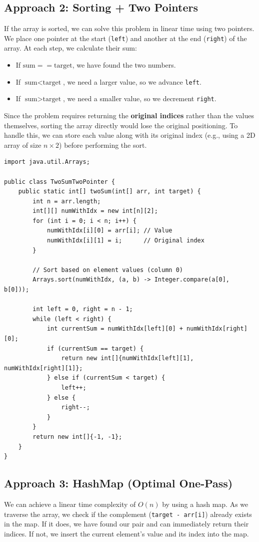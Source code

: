 \documentclass[12pt,a4paper,oneside]{book}
\begin{document}
\subsection{Approach 2: Sorting + Two Pointers}
If the array is sorted, we can solve this problem in linear time using two pointers. We place one pointer at the start (\texttt{left}) and another at the end (\texttt{right}) of the array. At each step, we calculate their sum:
\begin{itemize}
    \item If $\text{sum} == \text{target}$, we have found the two numbers.
    \item If $\text{sum} < \text{target}$, we need a larger value, so we advance \texttt{left}.
    \item If $\text{sum} > \text{target}$, we need a smaller value, so we decrement \texttt{right}.
\end{itemize}

Since the problem requires returning the \textbf{original indices} rather than the values themselves, sorting the array directly would lose the original positioning. To handle this, we can store each value along with its original index (e.g., using a 2D array of size $n \times 2$) before performing the sort.

\begin{lstlisting}[caption={Two Sum --- Sorting + Two Pointer approach O(n log n) time O(n) space}]
import java.util.Arrays;

public class TwoSumTwoPointer {
    public static int[] twoSum(int[] arr, int target) {
        int n = arr.length;
        int[][] numWithIdx = new int[n][2];
        for (int i = 0; i < n; i++) {
            numWithIdx[i][0] = arr[i]; // Value
            numWithIdx[i][1] = i;      // Original index
        }

        // Sort based on element values (column 0)
        Arrays.sort(numWithIdx, (a, b) -> Integer.compare(a[0], b[0]));

        int left = 0, right = n - 1;
        while (left < right) {
            int currentSum = numWithIdx[left][0] + numWithIdx[right][0];
            if (currentSum == target) {
                return new int[]{numWithIdx[left][1], numWithIdx[right][1]};
            } else if (currentSum < target) {
                left++;
            } else {
                right--;
            }
        }
        return new int[]{-1, -1};
    }
}
\end{lstlisting}

\subsection{Approach 3: HashMap (Optimal One-Pass)}
We can achieve a linear time complexity of $O(n)$ by using a hash map. As we traverse the array, we check if the complement (\texttt{target - arr[i]}) already exists in the map. If it does, we have found our pair and can immediately return their indices. If not, we insert the current element's value and its index into the map.
\end{document}
